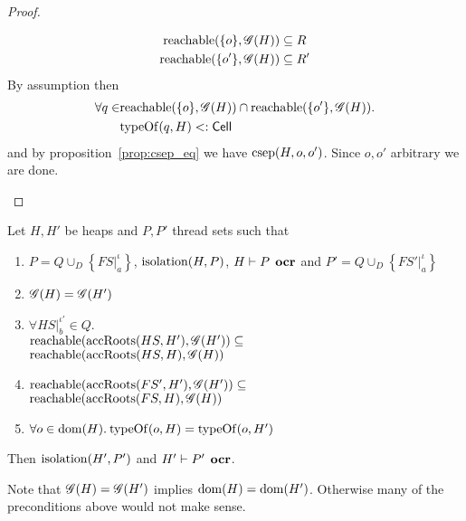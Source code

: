 \begin{proof}
\begin{description}
\begin{gather*}
        \mbox{$\mathrm{reachable}$}(\{o\}, \mathscr{G}(H)) \subseteq R \\
        \mbox{$\mathrm{reachable}$}(\{o'\}, \mathscr{G}(H)) \subseteq R'
      \end{gather*}
      By assumption then
      \begin{align*}
        \forall q \in &\mbox{$\mathrm{reachable}$}(\{o\}, \mathscr{G}(H)) \cap \mbox{$\mathrm{reachable}$}(\{o'\},
        \mathscr{G}(H)). \\ 
        &\mbox{$\mathrm{typeOf}$}(q, H) <: \mbox{$\mathsf{Cell}$}
      \end{align*}
      and by proposition~\ref{prop:csep_eq} we have $\mbox{$\mathrm{csep}$}(H, o, o')$. Since
      $o, o'$ arbitrary we are done.
  \end{description}
\end{proof}

\begin{proposition} \label{prop:2.11}
  Let $H, H'$ be heaps and $P, P'$ thread sets such that
  \begin{enumerate}
    \item $P = Q \cup_D \left\{ FS|_a^\iota \right\}$, $\mbox{$\mathrm{isolation}$}{(H, P)}$, $H
      \vdash P \:\: \mbox{\bf ocr}$ and $P' = Q \cup_D \left\{ FS'|_a^\iota \right\}$
    \item $\mathscr{G}{(H)} = \mathscr{G}{(H')}$
    \item $\forall HS|_b^{\iota'} \in Q.$ \\ 
      $\mbox{$\mathrm{reachable}$}{(\mbox{$\mathrm{accRoots}$}{(HS, H')}, \ensuremath{\mathscr{G}}{(H')})} \subseteq$ \\
      $\mbox{$\mathrm{reachable}$}{(\mbox{$\mathrm{accRoots}$}{(HS, H)}, \ensuremath{\mathscr{G}}{(H)})}$
    \item $\mbox{$\mathrm{reachable}$}{(\mbox{$\mathrm{accRoots}$}{(FS', H')}, \ensuremath{\mathscr{G}}{(H')})} \subseteq$ \\
      $\mbox{$\mathrm{reachable}$}{(\mbox{$\mathrm{accRoots}$}{(FS, H)}, \ensuremath{\mathscr{G}}{(H)})}$
    \item $\forall o \in \mbox{$\mathrm{dom}$}{(H)}. \: \mbox{$\mathrm{typeOf}$}{(o, H)} = \mbox{$\mathrm{typeOf}$}{(o, H')}$
  \end{enumerate}
  Then $\mbox{$\mathrm{isolation}$}{(H', P')}$ and $H' \vdash P' \:\: \mbox{\bf ocr}$.
\end{proposition}

\begin{remark}
  Note that $\mathscr{G}{(H)} = \mathscr{G}{(H')}$ implies $\mbox{$\mathrm{dom}$}{(H)} = \mbox{$\mathrm{dom}$}{(H')}$.
  Otherwise many of the preconditions above would not make sense.
\end{remark}


